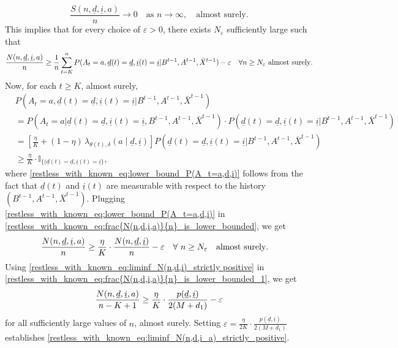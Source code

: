 \begin{equation}
	\frac{S(n,\underline{d},\underline{i},a)}{n}\longrightarrow 0\quad \text{as }n\to\infty,\quad \text{almost surely}.
\end{equation}
 This implies that for every choice of $\varepsilon>0$, there exists $N_\varepsilon$ sufficiently large such that
\begin{equation}
	\frac{N(n,\underline{d},\underline{i},a)}{n}\geq \frac{1}{n}\sum\limits_{t=K}^{n}P(A_t=a,\underline{d}(t)=\underline{d},\underline{i}(t)=\underline{i}|B^{t-1},A^{t-1},\bar{X}^{t-1})-\varepsilon \quad \forall n\geq N_\varepsilon \text{ almost surely}.\label{restless_with_known_eq:frac{N(n,d,i,a)}{n}_is_lower_bounded}
\end{equation}
Now, for each $t\geq K$, almost surely,
\begin{align}
	&P(A_t=a,\underline{d}(t)=\underline{d},\underline{i}(t)=\underline{i}|B^{t-1},A^{t-1},\bar{X}^{t-1})\nonumber\\
	&=P(A_t=a|\underline{d}(t)=\underline{d},\underline{i}(t)=\underline{i}, B^{t-1}, A^{t-1}, \bar{X}^{t-1})\cdot P(\underline{d}(t)=\underline{d},\underline{i}(t)=\underline{i}|B^{t-1},A^{t-1},\bar{X}^{t-1})\nonumber\\
	&=\left[\frac{\eta}{K}+(1-\eta)\,\lambda_{\theta(t),\delta}(a\mid \underline{d},\underline{i})\right]P(\underline{d}(t)=\underline{d},\underline{i}(t)=\underline{i}|B^{t-1},A^{t-1},\bar{X}^{t-1})\nonumber\\
	&\geq \frac{\eta}{K}\cdot \mathbb{I}_{\{(\underline{d}(t)=\underline{d},\underline{i}(t)=\underline{i}\}},\label{restless_with_known_eq:lower_bound_P(A_t=a,d,i)}
\end{align}
where \eqref{restless_with_known_eq:lower_bound_P(A_t=a,d,i)} follows from the fact that $\underline{d}(t)$ and $\underline{i}(t)$ are measurable with respect to the history $(B^{t-1}, A^{t-1},\bar{X}^{t-1})$.
Plugging \eqref{restless_with_known_eq:lower_bound_P(A_t=a,d,i)} in \eqref{restless_with_known_eq:frac{N(n,d,i,a)}{n}_is_lower_bounded}, we get
\begin{align}
	\frac{N(n,\underline{d},\underline{i},a)}{n} &\geq \frac{\eta}{K}\cdot \frac{N(n,\underline{d},\underline{i})}{n}-\varepsilon\quad \forall~ n\geq N_\varepsilon \quad \text{almost surely}.\label{restless_with_known_eq:frac{N(n,d,i,a)}{n}_is_lower_bounded_1}
\end{align}
Using \eqref{restless_with_known_eq:liminf_N(n,d,i)_strictly positive} in \eqref{restless_with_known_eq:frac{N(n,d,i,a)}{n}_is_lower_bounded_1}, we get
\begin{equation}
	\frac{N(n,\underline{d},\underline{i},a)}{n-K+1} \geq \frac{\eta}{K}\cdot \frac{p(\underline{d}, \underline{i})}{2(M+d_1)}-\varepsilon\label{restless_with_known_eq:frac{N(n,d,i,a)}{n}_is_lower_bounded_2}
\end{equation}
for all sufficiently large values of $n$, almost surely.
Setting $\varepsilon=\frac{\eta}{2K}\cdot \frac{p(\underline{d}, \underline{i})}{2(M+d_1)}$ establishes \eqref{restless_with_known_eq:liminf_N(n,d,i_a)_strictly_positive}. 

